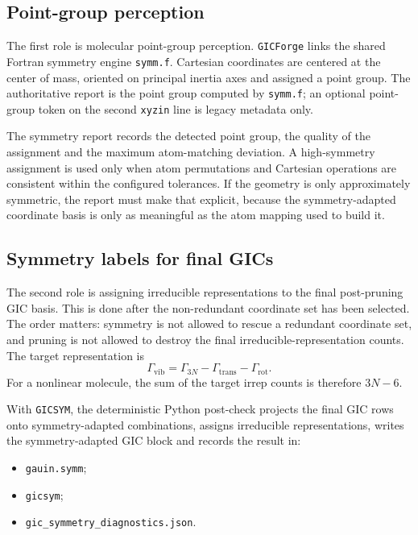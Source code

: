 \documentclass[11pt]{article}
\newcommand{\program}{\texttt{GICForge}}
\newcommand{\xyzin}{\texttt{xyzin}}
\begin{document}
\subsection{Point-group perception}

The first role is molecular point-group perception.  \program{} links the
shared Fortran symmetry engine \texttt{symm.f}.  Cartesian coordinates are
centered at the center of mass, oriented on principal inertia axes and assigned
a point group.  The authoritative report is the point group computed by
\texttt{symm.f}; an optional point-group token on the second \xyzin{} line is
legacy metadata only.

The symmetry report records the detected point group, the quality of the
assignment and the maximum atom-matching deviation.  A high-symmetry assignment
is used only when atom permutations and Cartesian operations are consistent
within the configured tolerances.  If the geometry is only approximately
symmetric, the report must make that explicit, because the symmetry-adapted
coordinate basis is only as meaningful as the atom mapping used to build it.

\subsection{Symmetry labels for final GICs}

The second role is assigning irreducible representations to the final
post-pruning GIC basis.  This is done after the non-redundant coordinate set has
been selected.  The order matters: symmetry is not allowed to rescue a
redundant coordinate set, and pruning is not allowed to destroy the final
irreducible-representation counts.  The target representation is
\[
  \Gamma_\mathrm{vib} = \Gamma_{3N}-\Gamma_\mathrm{trans}-\Gamma_\mathrm{rot}.
\]
For a nonlinear molecule, the sum of the target irrep counts is therefore
\(3N-6\).

With \texttt{GICSYM}, the deterministic Python post-check projects the final
GIC rows onto symmetry-adapted combinations, assigns irreducible
representations, writes the symmetry-adapted GIC block and records the result
in:

\begin{itemize}
  \item \texttt{gauin.symm};
  \item \texttt{gicsym};
  \item \texttt{gic\_symmetry\_diagnostics.json}.
\end{itemize}
\end{document}
